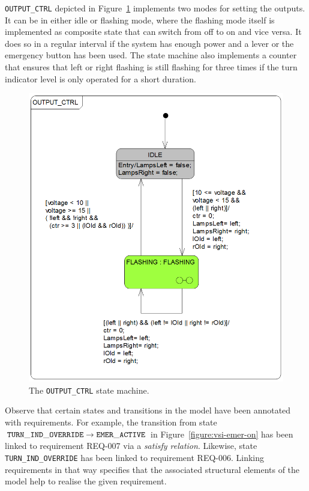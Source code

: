 {\tt OUTPUT\_CTRL} depicted in Figure~\ref{figure:vsi-output-ctrl} implements two
modes for setting the outputs. It can be in either idle or flashing mode, 
where the flashing mode itself is implemented as composite state that can
switch from off to on and vice versa. It does so in a regular interval if
the system has enough power and a lever or the emergency button has been used.
The state machine also implements a counter that ensures that left or right flashing
is still flashing for three times if the turn indicator level is only operated for a short duration.
\begin{figure}[hpt!]
    \centerline{\includegraphics[scale=0.3]{turnindicator/AS_SAMPLE_OUTPUT_CTRL.png}}
    \caption{The {\tt OUTPUT\_CTRL} state machine.}
    \label{figure:vsi-output-ctrl}
\end{figure}

Observe that certain states and transitions in the model have been
annotated with requirements. For example, the transition from state ${\tt
TURN\_IND\_OVERRIDE} \to {\tt EMER\_ACTIVE}$ in
Figure~\ref{figure:vsi-emer-on} has been linked to requirement {\sf REQ-007}
via a \emph{satisfy relation}. Likewise, state {\tt TURN\_IND\_OVERRIDE} has
been linked to requirement {\sf REQ-006}.
Linking requirements in that way specifies that the associated structural elements
of the model help to realise the given requirement.

